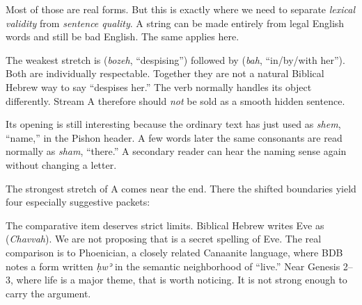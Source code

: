 Most of those are real forms. But this is exactly where we need to separate \emph{lexical validity} from \emph{sentence quality}. A string can be made entirely from legal English words and still be bad English. The same applies here.

The weakest stretch is  (\textit{bozeh}, ``despising'') followed by  (\textit{bah}, ``in/by/with her''). Both are individually respectable. Together they are not a natural Biblical Hebrew way to say ``despises her.'' The verb normally handles its object differently.\cite{BDB} Stream A therefore should \emph{not} be sold as a smooth hidden sentence.

Its opening is still interesting because the ordinary text has just used  as \textit{shem}, ``name,'' in the Pishon header. A few words later the same consonants are read normally as \textit{sham}, ``there.'' A secondary reader can hear the naming sense again without changing a letter.

The strongest stretch of A comes near the end. There the shifted boundaries yield four especially suggestive packets:


The comparative item  deserves strict limits. Biblical Hebrew writes Eve as  (\textit{Chavvah}). We are not proposing that  is a secret spelling of Eve. The real comparison is to Phoenician, a closely related Canaanite language, where BDB notes a form written \textit{ḥwʾ} in the semantic neighborhood of ``live.''\cite{BDB} Near Genesis 2--3, where life is a major theme, that is worth noticing. It is not strong enough to carry the argument.

